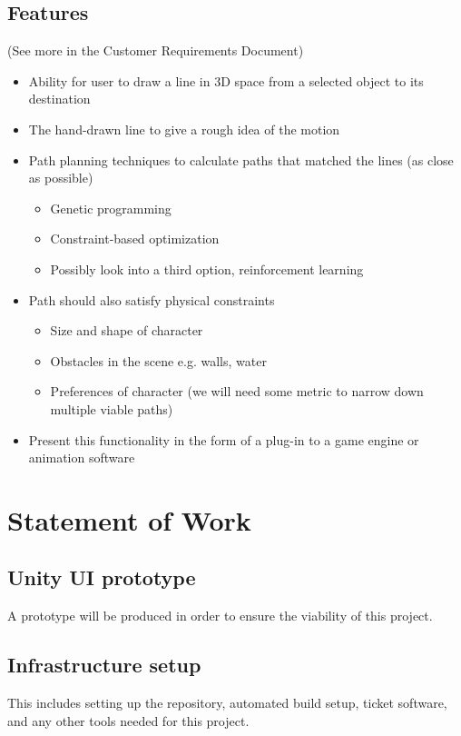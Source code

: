 \documentclass[12pt]{article}
\begin{document}
\subsection{Features}
(See more in the Customer Requirements Document)
\begin{itemize}
  \item Ability for user to draw a line in 3D space from a selected object to its destination
  \item The hand-drawn line to give a rough idea of the motion 
  \item Path planning techniques to calculate paths that matched the lines (as close as possible) 
  	\begin{itemize}
	  \item Genetic programming
	  \item Constraint-based optimization
	  \item Possibly look into a third option, reinforcement learning
	\end{itemize}
  \item Path should also satisfy physical constraints
	\begin{itemize}
	  \item Size and shape of character
	  \item Obstacles in the scene e.g. walls, water
	  \item Preferences of character (we will need some metric to narrow down multiple viable paths)
	\end{itemize}
  \item Present this functionality in the form of a plug-in to a game engine or animation software
\end{itemize}


\section{Statement of Work}
\label{sec:work}
\subsection{Unity UI prototype} 
A prototype will be produced in order to ensure the viability of this project.

\subsection{Infrastructure setup} 
This includes setting up the repository, automated build setup, ticket software, and any other tools needed for this project.
\end{document}
